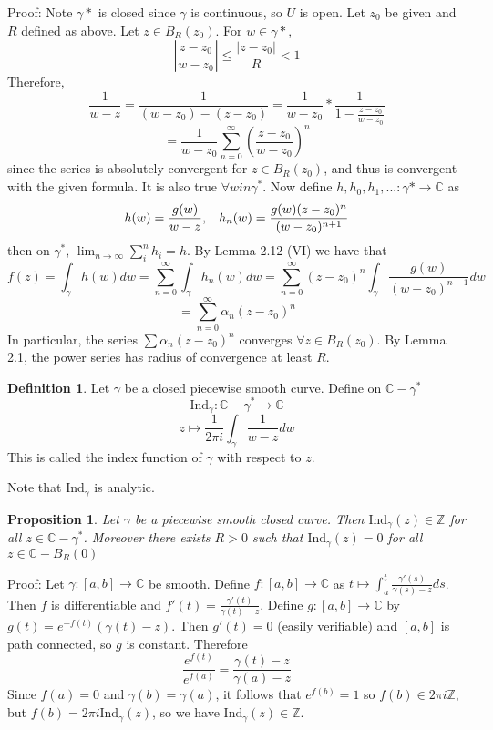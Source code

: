 \documentclass[11pt]{article}
\theoremstyle{plain}
\newtheorem{proposition}[theorem]{Proposition}
\theoremstyle{definition}
\newtheorem{definition}[theorem]{Definition}
\newcommand{\C}{\mathbb{C}}
\newcommand{\Ind}{\text{Ind}}
\begin{document}
Proof: Note $\gamma*$ is closed since $\gamma$ is continuous, so $U$ is open. Let $z_0$ be given and $R$ defined as above. Let $z \in B_R(z_0)$. For $w \in \gamma*$, 
$$ \left| \frac{z - z_0}{w - z_0} \right| \leq \frac{|z - z_0|}{R} < 1 $$
Therefore, 
$$ \frac{1}{w - z} = \frac{1}{(w - z_0) - (z - z_0)} = \frac{1}{w - z_0} * \frac{1}{1 - \frac{z - z_0}{w - z_0}} $$
$$ = \frac{1}{w- z_0} \sum_{n=0}^{\infty} \left(\frac{z - z_0}{w - z_0}\right)^n $$
since the series is absolutely convergent for $z \in B_R(z_0)$, and thus is convergent with the given formula. It is also true $\forall w in \gamma^*$. Now define $h, h_0, h_1, ...: \gamma* \to \C$ as 
$$ h(w) = \frac{g(w)}{w-z}, \hspace{3mm} h_n(w) = \frac{g(w)(z - z_0)^n}{(w - z_0)^{n+1}} $$
then on $\gamma^*$, $\lim_{n \to \infty} \sum_i^n h_i = h$. By Lemma 2.12 (VI) we have that 
$$ f(z) = \int_{\gamma} h(w)dw = \sum_{n=0}^{\infty} \int_{\gamma}h_n(w)dw = \sum_{n = 0}^{\infty}(z - z_0)^n \int_{\gamma} \frac{g(w)}{(w - z_0)^{n-1}} dw $$
$$ = \sum_{n = 0}^{\infty} \alpha_n (z - z_0)^n $$
In particular, the series $\sum \alpha_n (z - z_0)^n$ converges $\forall z \in B_R(z_0)$. By Lemma 2.1, the power series has radius of convergence at least $R$.

\begin{definition}
Let $\gamma$ be a closed piecewise smooth curve. Define on $\C - \gamma^*$
$$ \Ind_{\gamma}: \C - \gamma^* \to \C $$
$$ z \mapsto \frac{1}{2\pi i}\int_{\gamma} \frac{1}{w-z} dw $$
This is called the index function of $\gamma$ with respect to $z$.
\end{definition}

Note that $\Ind_{\gamma}$ is analytic. 

\begin{proposition}
Let $\gamma$ be a piecewise smooth closed curve. Then $\Ind_{\gamma}(z) \in \mathbb{Z}$ for all $z \in \C - \gamma^*$. Moreover there exists $R > 0$ such that $\Ind_{\gamma}(z) = 0$ for all $z \in \C - B_R(0)$
\end{proposition}

Proof: Let $\gamma:[a,b] \to \C$ be smooth. Define $f:[a, b] \to \C$ as $t \mapsto \int_a^t \frac{\gamma'(s)}{\gamma(s) - z} ds$. Then $f$ is differentiable and $f'(t) = \frac{\gamma'(t)}{\gamma(t) - z}$. Define $g:[a, b] \to \C$ by $g(t) = e^{-f(t)}(\gamma(t) - z)$. Then $g'(t) = 0$ (easily verifiable) and $[a,b]$ is path connected, so $g$ is constant. Therefore 
$$ \frac{e^{f(t)}}{e^{f(a)}} = \frac{\gamma(t) - z}{\gamma(a) - z} $$
Since $f(a) = 0$ and $\gamma(b) = \gamma(a)$, it follows that $e^{f(b)} = 1$ so $f(b) \in 2\pi i \mathbb{Z}$, but $f(b) = 2\pi i \Ind_{\gamma}(z)$, so we have $\Ind_{\gamma}(z) \in \mathbb{Z}$.
\end{document}
